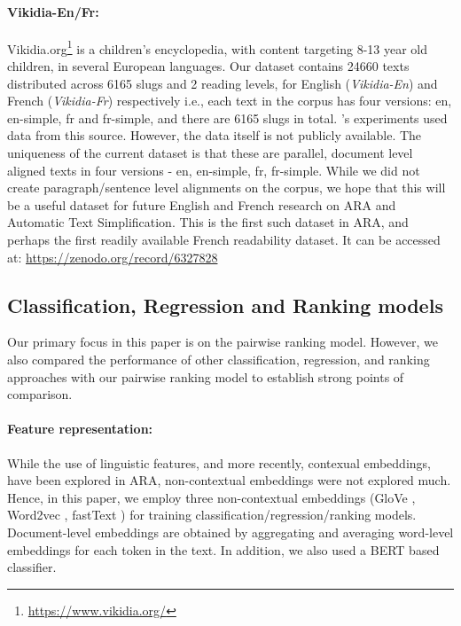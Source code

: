 \documentclass[11pt]{article}
\begin{document}
\paragraph{Vikidia-En/Fr: } Vikidia.org\footnote{\url{https://www.vikidia.org/}} is a children's encyclopedia, with content targeting 8-13 year old children, in several European languages. Our dataset contains 24660 texts distributed across 6165 slugs and 2 reading levels, for English (\textit{Vikidia-En}) and French (\textit{Vikidia-Fr}) respectively i.e., each text in the corpus has four versions: en, en-simple, fr and fr-simple, and there are 6165 slugs in total. 's experiments used data from this source. However, the data itself is not publicly available. The uniqueness of the current dataset is that these are parallel, document level aligned texts in four versions - en, en-simple, fr, fr-simple. While we did not create paragraph/sentence level alignments on the corpus, we hope that this will be a useful dataset for future English and French research on ARA and Automatic Text Simplification. This is the first such dataset in ARA, and perhaps the first readily available French readability dataset. It can be accessed at: \url{https://zenodo.org/record/6327828}


\subsection{Classification, Regression and Ranking models}
Our primary focus in this paper is on the pairwise ranking model. However, we also compared the performance of other classification, regression, and ranking approaches with our pairwise ranking model to establish strong points of comparison.

\paragraph{Feature representation: } While the use of linguistic features, and more recently, contexual embeddings, have been explored in ARA, non-contextual embeddings were not explored much. Hence, in this paper, we employ three non-contextual embeddings (GloVe \cite{Pennington.Socher.ea-14}, Word2vec \cite{mikolov2013efficient}, fastText \cite{Bojanoswki.Grave.ea-17}) for training classification/regression/ranking models.  Document-level embeddings are obtained by aggregating and averaging word-level embeddings for each token in the text. In addition, we also used a BERT \cite{devlin2018bert} based classifier.
\end{document}
